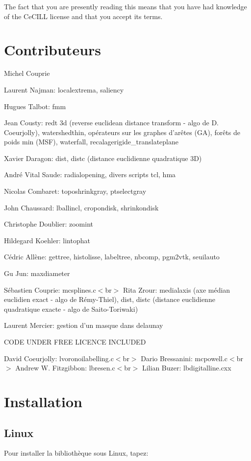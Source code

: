 The fact that you are presently reading this means that you have had knowledge of the Ce\-CILL license and that you accept its terms.\section{Contributeurs}\label{contributors}
Michel Couprie\par
 Laurent Najman: localextrema, saliency\par
 Hugues Talbot: fmm \par
 Jean Cousty: redt 3d (reverse euclidean distance transform - algo de D. Coeurjolly), watershedthin, op\'{e}rateurs sur les graphes d'ar\^{e}tes (GA), for\^{e}ts de poids min (MSF), waterfall, recalagerigide\_\-translateplane\par
 Xavier Daragon: dist, distc (distance euclidienne quadratique 3D)\par
 Andr\'{e} Vital Saude: radialopening, divers scripts tcl, hma\par
 Nicolas Combaret: toposhrinkgray, ptselectgray\par
 John Chaussard: lballincl, cropondisk, shrinkondisk\par
 Christophe Doublier: zoomint\par
 Hildegard Koehler: lintophat\par
 C\'{e}dric All\`{e}ne: gettree, histolisse, labeltree, nbcomp, pgm2vtk, seuilauto\par
 Gu Jun: maxdiameter\par
 S\'{e}bastien Couprie: mcsplines.c$<$br$>$ Rita Zrour: medialaxis (axe m\'{e}dian euclidien exact - algo de R\'{e}my-Thiel), dist, distc (distance euclidienne quadratique exacte - algo de Saito-Toriwaki)\par
 Laurent Mercier: gestion d'un masque dans delaunay\par


CODE UNDER FREE LICENCE INCLUDED

David Coeurjolly: lvoronoilabelling.c$<$br$>$ Dario Bressanini: mcpowell.c$<$br$>$ Andrew W. Fitzgibbon: lbresen.c$<$br$>$ Lilian Buzer: lbdigitalline.cxx\section{Installation}\label{install}
\subsection{Linux}\label{linux}
Pour installer la biblioth\`{e}que sous Linux, tapez: 

